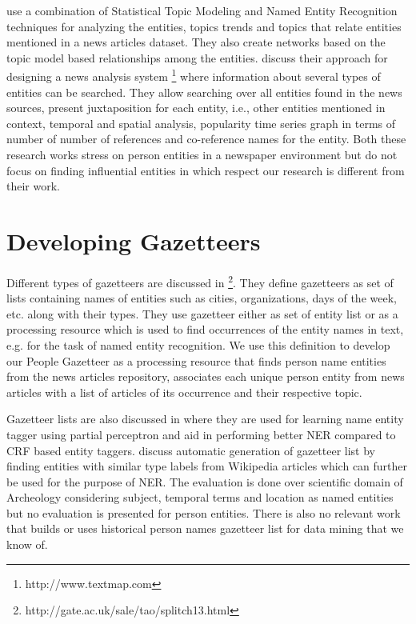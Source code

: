 \documentclass[letterpaper,11pt]{report}
\begin{document}
\cite{newman2006analyzing} use a combination of Statistical Topic Modeling and Named Entity Recognition techniques for analyzing the entities, topics trends and topics that relate entities mentioned in a news articles dataset. They also create networks based on the topic model based relationships among the entities.
\cite{lloyd2005lydia} discuss their approach for designing a news analysis system \footnote{http://www.textmap.com} where information about several types of entities can be searched. They allow searching over all entities found in the news sources, present juxtaposition for each entity, i.e., other entities mentioned in context, temporal and spatial analysis, popularity time series graph in terms of number of number of references and co-reference names for the entity.
Both these research works stress on person entities in a newspaper environment but do not focus on finding influential entities in which respect our research is different from their work.


\section{Developing Gazetteers}
Different types of gazetteers are discussed in \footnote{http://gate.ac.uk/sale/tao/splitch13.html}. They define gazetteers as set of lists containing names of entities such as cities, organizations, days of the week, etc. along with their types. They use gazetteer either as set of entity list or as a processing resource which is used to find occurrences of the entity names in text, e.g. for the task of named entity recognition. We use this definition to develop our People Gazetteer as a processing resource that finds person name entities from the news articles repository, associates each unique person entity from news articles with a list of articles of its occurrence and their respective topic.

Gazetteer lists are also discussed in \cite{carlson2009learning} where they are used for learning name entity tagger using partial perceptron and aid in performing better NER compared to CRF based entity taggers.
\cite{zhang2009novel} discuss automatic generation of gazetteer list by finding entities with similar type labels from Wikipedia articles which can further be used for the purpose of NER. The evaluation is done over scientific domain of Archeology considering subject, temporal terms and location as named entities but no evaluation is presented for person entities.
There is also no relevant work that builds or uses historical person names gazetteer list for data mining that we know of.
\end{document}
